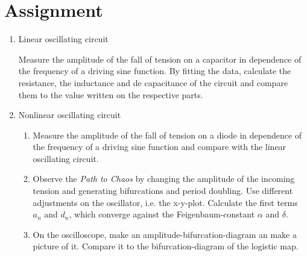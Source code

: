 \section{Assignment}

\begin{enumerate}
\item Linear oscillating circuit

Measure the amplitude of the fall of tension on a capacitor in dependence of the frequency of a driving sine function. By fitting the data, calculate the resistance, the inductance and de capacitance of the circuit and compare them to the value written on the respective parts.

\item Nonlinear oscillating circuit 

\begin{enumerate}

\item Measure the amplitude of the fall of tension on a diode in dependence of the frequency of a driving sine function and compare with the linear oscillating circuit.
\item Observe the \emph{Path to Chaos} by changing the amplitude of the incoming tension and generating bifurcations and period doubling. Use different adjustments on the oscillator, i.e. the x-y-plot. Calculate the first terms $a_n$ and $d_n$, which converge against the Feigenbaum-constant $\alpha$ and $\delta$.
\item On the oscilloscope, make an amplitude-bifurcation-diagram an make a picture of it. Compare it to the bifurcation-diagram of the logistic map.

\end{enumerate}
\end{enumerate}